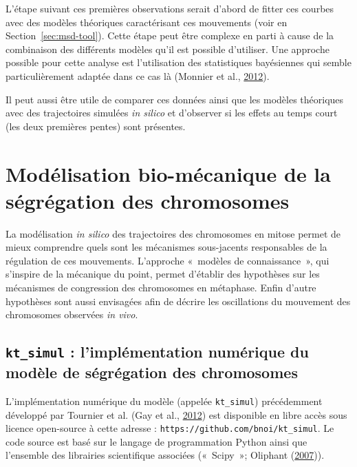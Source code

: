 \documentclass[12pt,a4paper,twoside,openright]{book}
\begin{document}
L'étape suivant ces premières observations serait d'abord de fitter ces
courbes avec des modèles théoriques caractérisant ces mouvements (voir
en Section~\ref{sec:msd-tool}). Cette étape peut être complexe en parti
à cause de la combinaison des différents modèles qu'il est possible
d'utiliser. Une approche possible pour cette analyse est l'utilisation
des statistiques bayésiennes qui semble particulièrement adaptée dans ce
cas là (Monnier et al., \protect\hyperlink{ref-Monnier2012}{2012}).

Il peut aussi être utile de comparer ces données ainsi que les modèles
théoriques avec des trajectoires simulées \emph{in silico} et d'observer
si les effets au temps court (les deux premières pentes) sont présentes.

\section{Modélisation bio-mécanique de la ségrégation des
chromosomes}\label{moduxe9lisation-bio-muxe9canique-de-la-suxe9gruxe9gation-des-chromosomes}

La modélisation \emph{in silico} des trajectoires des chromosomes en
mitose permet de mieux comprendre quels sont les mécanismes sous-jacents
responsables de la régulation de ces mouvements. L'approche «~modèles de
connaissance~», qui s'inspire de la mécanique du point, permet d'établir
des hypothèses sur les mécanismes de congression des chromosomes en
métaphase. Enfin d'autre hypothèses sont aussi envisagées afin de
décrire les oscillations du mouvement des chromosomes observées \emph{in
vivo}.

\subsection{\texorpdfstring{\texttt{kt\_simul} : l'implémentation
numérique du modèle de ségrégation des
chromosomes}{kt\_simul : l'implémentation numérique du modèle de ségrégation des chromosomes}}\label{ktux5fsimul-limpluxe9mentation-numuxe9rique-du-moduxe8le-de-suxe9gruxe9gation-des-chromosomes}

L'implémentation numérique du modèle (appelée \texttt{kt\_simul})
précédemment développé par Tournier et al. (Gay et al.,
\protect\hyperlink{ref-Gay2012a}{2012}) est disponible en libre accès
sous licence open-source à cette adresse :
\texttt{https://github.com/bnoi/kt\_simul}. Le code source est basé sur
le langage de programmation Python ainsi que l'ensemble des librairies
scientifique associées («~Scipy~»; Oliphant
(\protect\hyperlink{ref-Oliphant2007}{2007})).
\end{document}
